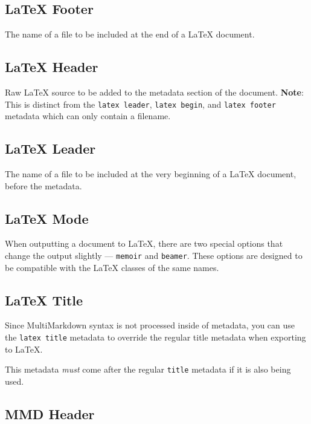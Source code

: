 \subsection{LaTeX Footer }
\label{latexfooter}

The name of a file to be included at the end of a LaTeX document.

\subsection{LaTeX Header }
\label{latexheader}

Raw LaTeX source to be added to the metadata section of the document. \textbf{Note}: This is distinct from the \texttt{latex leader}, \texttt{latex begin}, and \texttt{latex footer} metadata which can only contain a filename.

\subsection{LaTeX Leader }
\label{latexleader}

The name of a file to be included at the very beginning of a LaTeX document, before the metadata.

\subsection{LaTeX Mode }
\label{latexmode}

When outputting a document to LaTeX, there are two special options that change
the output slightly --- \texttt{memoir} and \texttt{beamer}. These options are designed to
be compatible with the LaTeX classes of the same names.

\subsection{LaTeX Title }
\label{latextitle}

Since MultiMarkdown syntax is not processed inside of metadata, you can use the \texttt{latex title} metadata to override the regular title metadata when exporting to LaTeX.

This metadata \emph{must} come after the regular \texttt{title} metadata if it is also being used.

\subsection{MMD Header }
\label{mmdheader}

